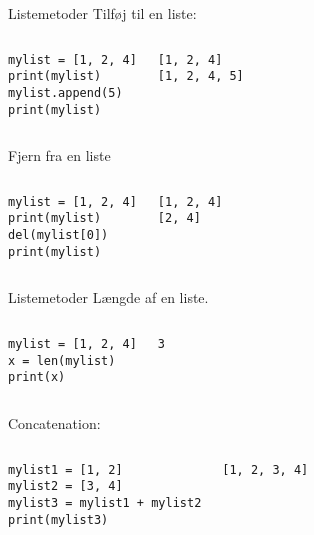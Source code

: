 \begin{frame}[fragile]{Listemetoder}
	Tilføj til en liste:
	\begin{columns}
		\begin{lstlisting}[style=python]
mylist = [1, 2, 4]
print(mylist)
mylist.append(5)
print(mylist)
		\end{lstlisting}
		\begin{lstlisting}[style=python]
[1, 2, 4]
[1, 2, 4, 5]
		\end{lstlisting}
	\end{columns}
	\pause
	Fjern fra en liste
	\begin{columns}
		\column{0.4\textwidth}
		\begin{lstlisting}[style=python]
mylist = [1, 2, 4]
print(mylist)
del(mylist[0])
print(mylist)
		\end{lstlisting}
		\column{0.4\textwidth}
		\begin{lstlisting}[style=python]
[1, 2, 4]
[2, 4]
		\end{lstlisting}
	\end{columns}
\end{frame}

\begin{frame}[fragile]{Listemetoder}
	Længde af en liste.
	\begin{columns}
		\column{0.4\textwidth}
		\begin{lstlisting}[style=python]
mylist = [1, 2, 4]
x = len(mylist)
print(x)
		\end{lstlisting}
		\column{0.4\textwidth}
		\begin{lstlisting}[style=python]
3
		\end{lstlisting}
	\end{columns}
	\pause
	Concatenation:
	\begin{columns}
		\begin{lstlisting}[style=python]
mylist1 = [1, 2]
mylist2 = [3, 4]
mylist3 = mylist1 + mylist2
print(mylist3)
		\end{lstlisting}
		\begin{lstlisting}[style=python]
[1, 2, 3, 4]
		\end{lstlisting}
	\end{columns}
\end{frame}

